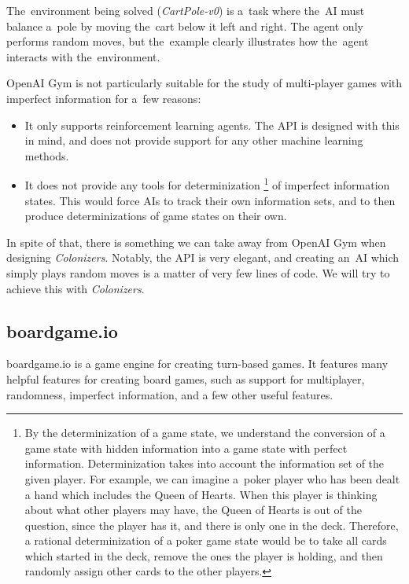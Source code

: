 The~environment being solved (\emph{CartPole-v0}) is a~task where the~AI must balance a~pole
by moving the~cart below it left and right. The agent only performs random moves,
but the~example clearly illustrates how the~agent interacts with the~environment.

OpenAI Gym is not particularly suitable for the study of multi-player games with imperfect
information for a~few reasons:
\begin{itemize}
    \item It only supports reinforcement learning agents. The API is designed with this
        in mind, and does not provide support for any other machine learning methods.
    \item It does not provide any tools for determinization
        \footnote{By the determinization
        of a game state, we understand the conversion of a game state with hidden
        information into a game state with perfect information. Determinization
        takes into account the information set of the given player. For example, we can
        imagine a~poker player who has been dealt a hand which includes the Queen
        of Hearts. When this player is thinking about what other players may have,
        the Queen of Hearts is out of the question, since the player has it, and there
        is only one in the deck. Therefore, a rational determinization of a poker
        game state would be to take all cards which started in the deck, remove
        the ones the player is holding, and then randomly assign other cards to the
        other players.} 
        of imperfect information states. This would force AIs
        to track their own information sets, and to then produce determinizations
        of game states on their own.
\end{itemize}

In spite of that, there is something we can take away from OpenAI Gym when designing
\emph{Colonizers}. Notably, the API is very elegant, and creating an~AI which simply
plays random moves is a matter of very few lines of code. We will try to achieve
this with \emph{Colonizers}.

\subsection{boardgame.io}

boardgame.io \cite{Boardgameio} is a game engine for creating turn-based games.
It features many helpful features for creating board games, such as support for
multiplayer, randomness, imperfect information, and a few other useful features.


